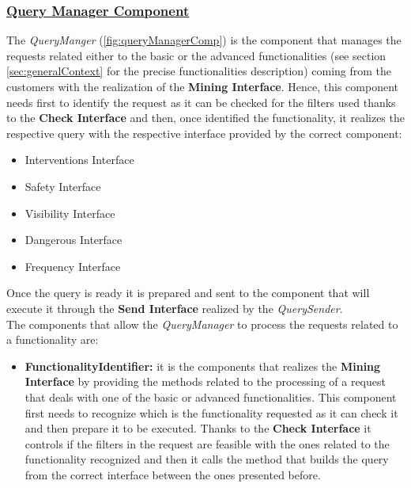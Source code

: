 		\subsubsection[Query Manager Component]{\hyperlink{toc}{Query Manager Component}}
			\label{sec:queryManagerComponent}
			
			The \emph{QueryManger} (\autoref{fig:queryManagerComp}) is the component that manages the requests related either to the basic or the advanced functionalities (see section \ref{sec:generalContext} for the precise functionalities description) coming from the customers with the realization of the \textbf{Mining Interface}. Hence, this component needs first to identify the request as it can be checked for the filters used thanks to the \textbf{Check Interface} and then, once identified the functionality, it realizes the respective query with the respective interface provided by the correct component:
			
			\begin{itemize}
				\item Interventions Interface
				\item Safety Interface
				\item Visibility Interface
				\item Dangerous Interface
				\item Frequency Interface
			\end{itemize}
		
			Once the query is ready it is prepared and sent to the component that will execute it through the \textbf{Send Interface} realized by the \emph{QuerySender}.\\
			
			The components that allow the \emph{QueryManager} to process the requests related to a functionality are:
			
			\begin{itemize}
				\item \textbf{FunctionalityIdentifier:} it is the components that realizes the \textbf{Mining Interface} by providing the methods related to the processing of a request that deals with one of the basic or advanced functionalities. This component first needs to recognize which is the functionality requested as it can check it and then prepare it to be executed. Thanks to the \textbf{Check Interface} it controls if the filters in the request are feasible with the ones related to the functionality recognized and then it calls the method that builds the query from the correct interface between the ones presented before.
			\end{itemize}
			
